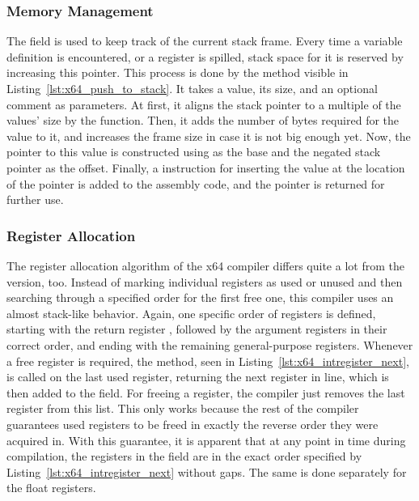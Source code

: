 \subsubsection{Memory Management}

The  field is used to keep track of the current stack frame.
Every time a variable definition is encountered, or a register is spilled, stack space for it is reserved by increasing this pointer.
This process is done by the  method visible in Listing~\ref{lst:x64_push_to_stack}.
It takes a value, its size, and an optional comment as parameters.
At first, it aligns the stack pointer to a multiple of the values' size by the  function.
Then, it adds the number of bytes required for the value to it, and increases the frame size in case it is not big enough yet.
Now, the pointer to this value is constructed using  as the base and the negated stack pointer as the offset.
Finally, a  instruction for inserting the value at the location of the pointer is added to the assembly code, and the pointer is returned for further use.



\subsubsection{Register Allocation}


The register allocation algorithm of the x64 compiler differs quite a lot from the \riscv{} version, too.
Instead of marking individual registers as used or unused and then searching through a specified order for the first free one, this compiler uses an almost stack-like behavior.
Again, one specific order of registers is defined, starting with the return register , followed by the argument registers in their correct order, and ending with the remaining general-purpose registers.
Whenever a free register is required, the  method, seen in Listing~\ref{lst:x64_intregister_next}, is called on the last used register, returning the next register in line, which is then added to the  field.
For freeing a register, the compiler just removes the last register from this list.
This only works because the rest of the compiler guarantees used registers to be freed in exactly the reverse order they were acquired in.
With this guarantee, it is apparent that at any point in time during compilation, the registers in the  field are in the exact order specified by Listing~\ref{lst:x64_intregister_next} without gaps.
The same is done separately for the float registers.

